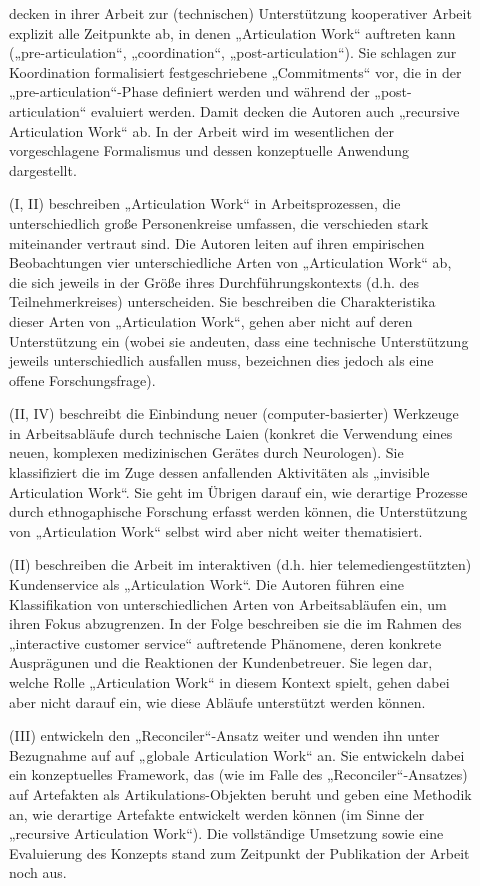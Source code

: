 \begin{description}
	\item[\citet{Raposo04}] decken in ihrer Arbeit zur (technischen) Unterstützung kooperativer Arbeit explizit alle Zeitpunkte ab, in denen „Articulation Work“ auftreten kann („pre-articulation“, „coordination“, „post-articulation“). Sie schlagen zur Koordination formalisiert festgeschriebene „Commitments“ vor, die in der „pre-articulation“-Phase definiert werden und während der „post-articulation“ evaluiert werden. Damit decken die Autoren auch „recursive Articulation Work“ \citep{Sarini02} ab. In der Arbeit wird im wesentlichen der vorgeschlagene Formalismus und dessen konzeptuelle Anwendung dargestellt.
	\item[\citet{Faergemann05}] (I, II) beschreiben „Articulation Work“ in Arbeitsprozessen, die unterschiedlich große Personenkreise umfassen, die verschieden stark miteinander vertraut sind. Die Autoren leiten auf ihren empirischen Beobachtungen vier unterschiedliche Arten von „Articulation Work“ ab, die sich jeweils in der Größe ihres Durchführungskontexts (d.h. des Teilnehmerkreises) unterscheiden. Sie beschreiben die Charakteristika dieser Arten von „Articulation Work“, gehen aber nicht auf deren Unterstützung ein (wobei sie andeuten, dass eine technische Unterstützung jeweils unterschiedlich ausfallen muss, bezeichnen dies jedoch als eine offene Forschungsfrage).
	\item[\citet{Hasu05}] (II, IV) beschreibt die Einbindung neuer (computer-basierter) Werkzeuge in Arbeitsabläufe durch technische Laien (konkret die Verwendung eines neuen, komplexen medizinischen Gerätes durch Neurologen). Sie klassifiziert die im Zuge dessen anfallenden Aktivitäten als „invisible Articulation Work“. Sie geht im Übrigen darauf ein, wie derartige Prozesse durch ethnogaphische Forschung erfasst werden können, die Unterstützung von „Articulation Work“ selbst wird aber nicht weiter thematisiert.
	\item[\citet{Hampson05}] (II) beschreiben die Arbeit im interaktiven (d.h. hier telemediengestützten) Kundenservice als „Articulation Work“. Die Autoren führen eine Klassifikation von unterschiedlichen Arten von Arbeitsabläufen ein, um ihren Fokus abzugrenzen. In der Folge beschreiben sie die im Rahmen des „interactive customer service“ auftretende Phänomene, deren konkrete Ausprägunen und die Reaktionen der Kundenbetreuer. Sie legen dar, welche Rolle „Articulation Work“ in diesem Kontext spielt, gehen dabei aber nicht darauf ein, wie diese Abläufe unterstützt werden können. 
	\item[\citet{Cabitza06}] (III) entwickeln den „Reconciler“-Ansatz weiter und wenden ihn unter Bezugnahme auf \citet{Faergemann05} auf „globale Articulation Work“ an. Sie entwickeln dabei ein konzeptuelles Framework, das (wie im Falle des „Reconciler“-Ansatzes) auf Artefakten als Artikulations-Objekten beruht und geben eine Methodik an, wie derartige Artefakte entwickelt werden können (im Sinne der „recursive Articulation Work“). Die vollständige Umsetzung sowie eine Evaluierung des Konzepts stand zum Zeitpunkt der Publikation der Arbeit noch aus. 

\end{description}
